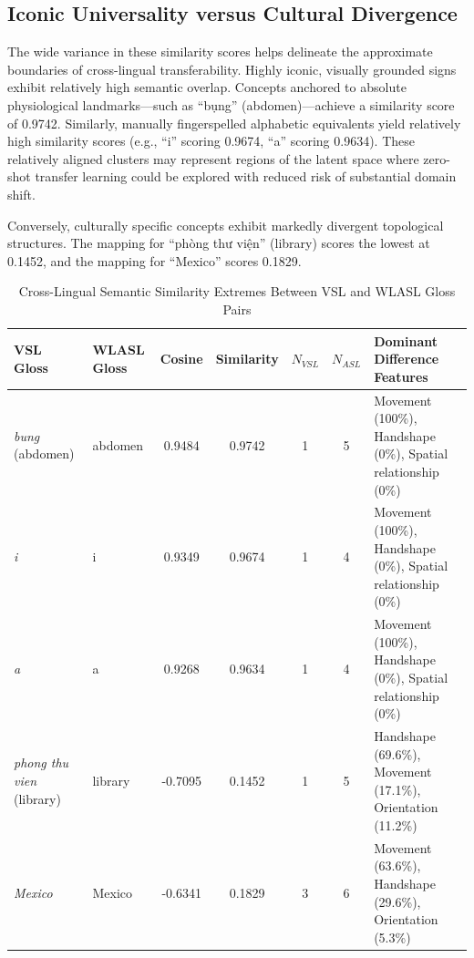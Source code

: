 \documentclass{ieeeaccess}
\begin{document}
\subsection{Iconic Universality versus Cultural Divergence} 
The wide variance in these similarity scores helps delineate the approximate boundaries of cross-lingual transferability. Highly iconic, visually grounded signs exhibit relatively high semantic overlap. Concepts anchored to absolute physiological landmarks—such as ``bụng'' (abdomen)—achieve a similarity score of 0.9742. Similarly, manually fingerspelled alphabetic equivalents yield relatively high similarity scores (e.g., ``i'' scoring 0.9674, ``a'' scoring 0.9634). These relatively aligned clusters may represent regions of the latent space where zero-shot transfer learning could be explored with reduced risk of substantial domain shift.

Conversely, culturally specific concepts exhibit markedly divergent topological structures. The mapping for ``phòng thư viện'' (library) scores the lowest at 0.1452, and the mapping for ``Mexico'' scores 0.1829.

\begin{table}[!t]
\caption{Cross-Lingual Semantic Similarity Extremes Between VSL and WLASL Gloss Pairs}
\label{tab:similarity_extremes}
\centering
\small
\setlength{\tabcolsep}{5pt}
\begin{tabular}{llccccp{6.2cm}}
\toprule
\textbf{VSL Gloss} &
\textbf{WLASL Gloss} &
\textbf{Cosine} &
\textbf{Similarity} &
\textbf{$N_{VSL}$} &
\textbf{$N_{ASL}$} &
\textbf{Dominant Difference Features} \\
\midrule

\textit{bung} (abdomen) &
abdomen &
0.9484 &
0.9742 &
1 &
5 &
Movement (100\%), Handshape (0\%), Spatial relationship (0\%) \\

\textit{i} &
i &
0.9349 &
0.9674 &
1 &
4 &
Movement (100\%), Handshape (0\%), Spatial relationship (0\%) \\

\textit{a} &
a &
0.9268 &
0.9634 &
1 &
4 &
Movement (100\%), Handshape (0\%), Spatial relationship (0\%) \\

\midrule

\textit{phong thu vien} (library) &
library &
-0.7095 &
0.1452 &
1 &
5 &
Handshape (69.6\%), Movement (17.1\%), Orientation (11.2\%) \\

\textit{Mexico} &
Mexico &
-0.6341 &
0.1829 &
3 &
6 &
Movement (63.6\%), Handshape (29.6\%), Orientation (5.3\%) \\

\bottomrule
\end{tabular}
\end{table}
\end{document}

